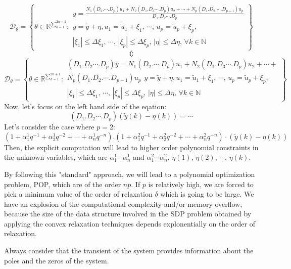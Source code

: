 \[
\mathcal{D}_\theta = \left\{ \theta \in \mathbb{R}^{\sum_{k=1}^{2n+1}} : 
\begin{array}{l}
y = \frac{N_1(D_2.\cdots.D_p)u_1 +N_2(D_1.D_3\cdots.D_p)u_2 + \cdots + N_p(D_1.D_2.\cdots.D_{p-1})u_p}{D_1.D_2\cdots.D_p}\\
y = \tilde{y} + \eta, 
u_1 = \tilde{u}_1 + \xi_1, \, \cdots, \, u_p = \tilde{u}_p + \xi_p, \\
|\xi_1| \leq \Delta \xi_1, \, \cdots, \, |\xi_p| \leq \Delta \xi_p, \, |\eta| \leq \Delta \eta, \, \forall k \in \mathbb{N}
\end{array}
\right\}
\]
\[\Updownarrow\]
\[
\mathcal{D}_\theta= \left\{ \theta \in \mathbb{R}^{\sum_{k=1}^{2n+1}} : 
\begin{array}{l}
(D_1.D_2\cdots.D_p)y = N_1(D_2.\cdots.D_p)u_1 +N_2(D_1.D_3\cdots.D_p)u_2 + \cdots +\\ N_p(D_1.D_2.\cdots.D_{p-1})u_p \:\:
y = \tilde{y} + \eta, 
u_1 = \tilde{u}_1 + \xi_1, \, \cdots, \, u_p = \tilde{u}_p + \xi_p, \\
|\xi_1| \leq \Delta \xi_1, \, \cdots, \, |\xi_p| \leq \Delta \xi_p, \, |\eta| \leq \Delta \eta, \, \forall k \in \mathbb{N}
\end{array}
\right\}
\]
Now, let's focus on the left hand side of the eqation:
\[
(D_1.D_2\cdots.D_p)(\tilde{y}(k)-\eta(k))=\cdots
\]
Let's consider the case where $p = 2$:
\[
(1 + \alpha_1^1 q^{-1} + \alpha_2^1 q^{-2} + \cdots + \alpha_n^1 q^{-n}).(1 + \alpha_1^2 q^{-1} + \alpha_2^2 q^{-2} + \cdots + \alpha_n^2 q^{-n})\cdot(\tilde{y}(k)-\eta(k)) 
\]
Then, the explicit computation will lead to higher order polynomial constraints in the unknown variables, which are $\alpha_1^1\cdots\alpha_n^1$ and $\alpha_1^2\cdots\alpha_n^2$, $\eta(1),\,\eta(2),\, \cdots,\,\eta(k)$.

By following this "standard" approach, we will lead to a polynomial optimization problem, POP, which are of the order $np$. If $p$ is relatively high, we are forced to pick a minimum value of the order of relaxation $\delta$ which is going to be large. We have an explosion of the computational complexity and/or memory overflow, because the size of the data structure involved in the SDP problem obtained by applying the convex relaxation techniques depends explonentially on the order of relaxation. 


\begin{factbox}[Quote]
Always consider that the transient of the system provides information about the poles and the zeros of the system.
\end{factbox}

